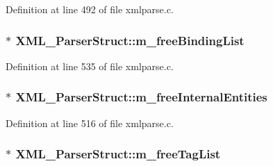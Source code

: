 Definition at line 492 of file xmlparse.\+c.

\subsubsection[{\texorpdfstring{m\+\_\+free\+Binding\+List}{m_freeBindingList}}]{$\ast$ X\+M\+L\+\_\+\+Parser\+Struct\+::m\+\_\+free\+Binding\+List}\hypertarget{struct_x_m_l___parser_struct_aaa3ecd765ede8080b0f6721e71dd4cbf}{}\label{struct_x_m_l___parser_struct_aaa3ecd765ede8080b0f6721e71dd4cbf}


Definition at line 535 of file xmlparse.\+c.

\subsubsection[{\texorpdfstring{m\+\_\+free\+Internal\+Entities}{m_freeInternalEntities}}]{$\ast$ X\+M\+L\+\_\+\+Parser\+Struct\+::m\+\_\+free\+Internal\+Entities}\hypertarget{struct_x_m_l___parser_struct_a9747a1bc68e7999012bb80f9c2d3bc2e}{}\label{struct_x_m_l___parser_struct_a9747a1bc68e7999012bb80f9c2d3bc2e}


Definition at line 516 of file xmlparse.\+c.

\subsubsection[{\texorpdfstring{m\+\_\+free\+Tag\+List}{m_freeTagList}}]{$\ast$ X\+M\+L\+\_\+\+Parser\+Struct\+::m\+\_\+free\+Tag\+List}\hypertarget{struct_x_m_l___parser_struct_aa8937e36b552360ceb161bbaa47a6274}{}\label{struct_x_m_l___parser_struct_aa8937e36b552360ceb161bbaa47a6274}


